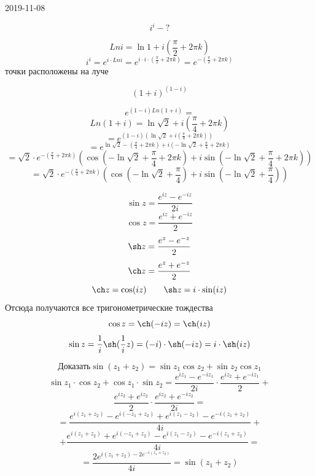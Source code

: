 \documentclass[main.tex]{subfiles}
\begin{document}
\begin{lect}{2019-11-08}
    \begin{Task}[4]
        \[i^i - ?\]
        
         \[Ln i = \ln 1 + i(\frac{\pi}{2} + 2\pi k)\]
        \[i^i = e^{i \cdot Ln i} = e^{i \cdot i \cdot (\frac{\pi}{2} + 2\pi k)} = 
        e^{-(\frac{\pi}{2}  +2\pi k)} \]
        точки расположены на луче
    \end{Task}

    \begin{Task}[5]
        \[(1 + i)^{(1 - i)} \]

        \[e^{(1 - i) Ln (1 + i) } = \]
        \[Ln(1 + i) = \ln \sqrt{2} + i(\frac{\pi}{4} + 2\pi k)\]
        \[= e^{(1 - i)(\ln \sqrt{2} + i(\frac{\pi}{4} + 2\pi k))} \]
        \[= e^{\ln \sqrt{2} - (\frac{\pi}{4} + 2\pi k) + i(-\ln \sqrt{2} + \frac{\pi}{4} + 
        2\pi k)} \]
        \[= \sqrt{2} \cdot e^{- (\frac{\pi}{4} + 2\pi k)}( \cos (-\ln \sqrt{2} + 
        \frac{\pi}{4} + 2\pi k) + i\sin(-\ln \sqrt{2} + 
        \frac{\pi}{4} + 2\pi k)) \]
        \[= \sqrt{2} \cdot e^{- (\frac{\pi}{4} + 2\pi k)} (\cos (-\ln \sqrt{2} + \frac{\pi}{4}) 
        + i\sin(-\ln\sqrt{2} + \frac{\pi}{4})) \]
    \end{Task}

    \begin{Definition}
        \[\sin z = \frac{e^{iz} - e^{-iz}  }{2i}\]
        \[\cos z = \frac{e^{iz} + e^{-iz} }{2}\]
        \[\sh z = \frac{e^z - e^{-z} }{2}\]
        \[\ch z = \frac{e^z  + e^{-z} }{2}\]
        \[\ch z = \cos(iz) \qq \sh z = i \cdot \sin(iz)\]
        Отсюда получаются все тригонометрические тождества 
        \[\cos z = \ch(-iz) = \ch(iz)\]
        \[\sin z = \frac{1}{i}\sh(\frac{1}{i}z) = (-i) \cdot \sh(-iz) = i \cdot \sh(iz)\]
    \end{Definition}

    \begin{Task}[6]
        \[\text{Доказать} \sin(z_1 + z_2) = \sin z_1 \cos z_2 + \sin z_2 \cos z_1\]
        \[\sin z_1 \cdot \cos z_2 + \cos z_1 \cdot \sin z_2 = 
        \frac{e^{iz_1} - e^{-iz_1}  }{2i} \cdot \frac{e^{iz_2} + e^{-iz_1} }{2} +\]
        \[\frac{e^{iz_2} + e^{iz_2}  }{2} \cdot \frac{e^{iz_2} + e^{-iz_2}  }{2i} =  \]
        \[= \frac{e^{i(z_1  + z_2)} - e^{i(-z_1 + z_2)} +
        e^{i(z_1 - z_2)} - e^{-i(z_1 + z_2)}}  {4i}  + \] %
        \[+ \frac{e^{i(z_1 + z_2)} + e^{i(-z_1 + z_2)} - 
        e^{i(z_1 - z_2)} - e^{-i(z_1 + z_2)}}{4i} =\]
        \[= \frac{2e^{i(z_1 + z_2) - 2e^{-i(z_1 + z_2)} } }{4i} = \sin(z_1 + z_2)\]
    \end{Task}


\end{lect}
\end{document}
